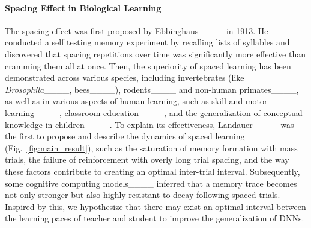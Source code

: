 \paragraph{Spacing Effect in Biological Learning}
The spacing effect was first proposed by Ebbinghaus____ in 1913. He conducted a self testing memory experiment by recalling lists of syllables and discovered that spacing repetitions over time was significantly more effective than cramming them all at once. Then, the superiority of spaced learning has been demonstrated across various species, including invertebrates (like \textit{Drosophila}____, bees____), rodents____ and non-human primates____, as well as in various aspects of human learning, such as skill and motor learning____, classroom education____, and the generalization of conceptual knowledge in children____. To explain its effectiveness, Landauer____ was the first to propose and describe the dynamics of spaced learning (Fig.~\ref{fig:main_result}), such as the saturation of memory formation with mass trials, the failure of reinforcement with overly long trial spacing, and the way these factors contribute to creating an optimal inter-trial interval. Subsequently, some cognitive computing models____ inferred that a memory trace becomes not only stronger but also highly resistant to decay following spaced trials.
Inspired by this, we hypothesize that there may exist an optimal interval between the learning paces of teacher and student to improve the generalization of DNNs.
\fi


